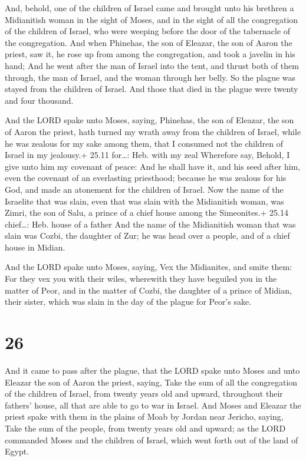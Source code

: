  And, behold, one of the children of Israel came and
brought unto his brethren a Midianitish woman in the sight of Moses, and
in the sight of all the congregation of the children of Israel, who were
weeping before the door of the tabernacle of the congregation.
 And when Phinehas, the son of Eleazar, the son of Aaron the
priest, saw it, he rose up from among the congregation, and took a
javelin in his hand;  And he went after the man of Israel
into the tent, and thrust both of them through, the man of Israel, and
the woman through her belly. So the plague was stayed from the children
of Israel.  And those that died in the plague were twenty
and four thousand.

 And the LORD spake unto Moses, saying, 
Phinehas, the son of Eleazar, the son of Aaron the priest, hath turned
my wrath away from the children of Israel, while he was zealous for my
sake among them, that I consumed not the children of Israel in my
jealousy.+ 25.11 for\ldots: Heb. with my zeal  Wherefore
say, Behold, I give unto him my covenant of peace:  And he
shall have it, and his seed after him, even the covenant of an
everlasting priesthood; because he was zealous for his God, and made an
atonement for the children of Israel.  Now the name of the
Israelite that was slain, even that was slain with the Midianitish
woman, was Zimri, the son of Salu, a prince of a chief house among the
Simeonites.+ 25.14 chief\ldots: Heb. house of a father  And
the name of the Midianitish woman that was slain was Cozbi, the daughter
of Zur; he was head over a people, and of a chief house in Midian.

 And the LORD spake unto Moses, saying,  Vex
the Midianites, and smite them:  For they vex you with
their wiles, wherewith they have beguiled you in the matter of Peor, and
in the matter of Cozbi, the daughter of a prince of Midian, their
sister, which was slain in the day of the plague for Peor's sake.

\hypertarget{section-25}{%
\section{26}\label{section-25}}

 And it came to pass after the plague, that the LORD spake
unto Moses and unto Eleazar the son of Aaron the priest, saying,
 Take the sum of all the congregation of the children of
Israel, from twenty years old and upward, throughout their fathers'
house, all that are able to go to war in Israel.  And Moses
and Eleazar the priest spake with them in the plains of Moab by Jordan
near Jericho, saying,  Take the sum of the people, from
twenty years old and upward; as the LORD commanded Moses and the
children of Israel, which went forth out of the land of Egypt.

